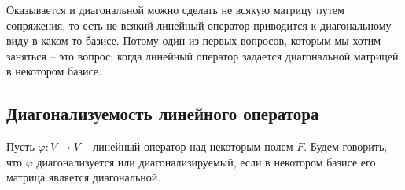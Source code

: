 Оказывается и диагональной можно сделать не всякую матрицу путем сопряжения, то есть не всякий линейный оператор приводится к диагональному виду в каком-то базисе.
Потому один из первых вопросов, которым мы хотим заняться -- это вопрос: когда линейный оператор задается диагональной матрицей в некотором базисе.
 

\subsection{Диагонализуемость линейного оператора}

\begin{definition}
Пусть $\varphi\colon V\to V$ -- линейный оператор над некоторым полем $F$.
Будем говорить, что $\varphi$ диагонализуется или диагонализируемый, если в некотором базисе его матрица является диагональной.
\end{definition}

